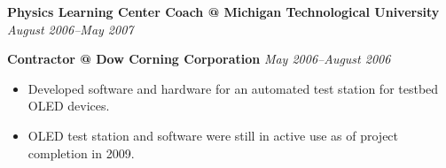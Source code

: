 \documentclass[12pt]{article}
\makeatletter
\newcommand{\jobitem}[4]{
    \vspace{5pt}

    \textbf{#1 @ #2} \hfill \textit{#3} %

    \vspace{-5pt}
}
\makeatother
\begin{document}
\jobitem{Physics Learning Center Coach}{Michigan Technological University}{August 2006--May 2007}{Houghton, MI}
\vspace{10pt}


\jobitem{Contractor}{Dow Corning Corporation}{May 2006--August 2006}{Midland, MI}

\begin{itemize}\setlength{\itemsep}{0cm}
  \setlength{\parskip}{0cm}
\item Developed software and hardware for an automated test station for testbed OLED devices. 
\item OLED test station and software were still in active use as of project completion in 2009.
\end{itemize}
%
\end{document}

